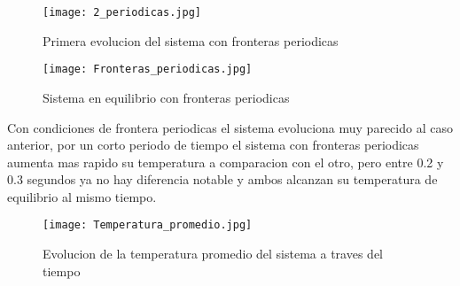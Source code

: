 \documentclass[12pt]{article}
\begin{document}
\begin{figure}[h!]
    \centering
    \texttt{[image: 2\_periodicas.jpg]}
    \caption{Primera evolucion del sistema con fronteras periodicas}
    \label{fig10}
\end{figure}

\begin{figure}[h!]
    \centering
    \texttt{[image: Fronteras\_periodicas.jpg]}
    \caption{Sistema en equilibrio con fronteras periodicas}
    \label{fig11}
\end{figure}
\newpage

Con condiciones de frontera periodicas el sistema evoluciona muy parecido al caso anterior, por un corto periodo de tiempo el sistema con fronteras periodicas aumenta mas rapido su temperatura a comparacion con el otro, pero entre 0.2 y 0.3 segundos ya no hay diferencia notable y ambos alcanzan su temperatura de equilibrio al mismo tiempo. 



\newpage
\begin{figure}[h!]
    \centering
    \texttt{[image: Temperatura\_promedio.jpg]}
    \caption{Evolucion de la temperatura promedio del sistema a traves del tiempo}
    \label{fig13}
\end{figure}
\end{document}
